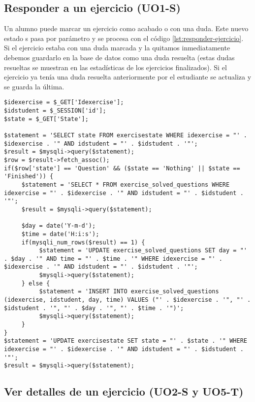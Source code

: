 \subsection{Responder a un ejercicio (UO1-S)}
\label{diseno-e-implementacion:logica-negocio:responder-ejercicio}

Un alumno puede marcar un ejercicio como acabado o con una duda. Este nuevo estado s pasa por parámetro y se procesa con el código \ref{lst:responder-ejercicio}.\\

Si el ejercicio estaba con una duda marcada y la quitamos inmediatamente debemos guardarlo en la base de datos como una duda resuelta (estas dudas resueltas se muestran en las estadísticas de los ejercicios finalizados). Si el ejercicio ya tenía una duda resuelta anteriormente por el estudiante se actualiza y se guarda la última.\\

\noindent
\begin{lstlisting}[caption=Responder a un ejercicio.,label={lst:responder-ejercicio}]
$idexercise = $_GET['Idexercise'];
$idstudent = $_SESSION['id'];
$state = $_GET['State'];

$statement = 'SELECT state FROM exercisestate WHERE idexercise = "' . $idexercise . '" AND idstudent = "' . $idstudent . '"';
$result = $mysqli->query($statement);
$row = $result->fetch_assoc();
if($row['state'] == 'Question' && ($state == 'Nothing' || $state == 'Finished')) {
     $statement = 'SELECT * FROM exercise_solved_questions WHERE idexercise = "' . $idexercise . '" AND idstudent = "' . $idstudent . '"';
     $result = $mysqli->query($statement);
	
     $day = date('Y-m-d');
     $time = date('H:i:s');
     if(mysqli_num_rows($result) == 1) {
          $statement = 'UPDATE exercise_solved_questions SET day = "' . $day . '" AND time = "' . $time . '" WHERE idexercise = "' . $idexercise . '" AND idstudent = "' . $idstudent . '"';
          $mysqli->query($statement);
     } else {
          $statement = 'INSERT INTO exercise_solved_questions (idexercise, idstudent, day, time) VALUES ("' . $idexercise . '", "' . $idstudent . '", "' . $day . '", "' . $time . '")';
          $mysqli->query($statement);
     }
}
$statement = 'UPDATE exercisestate SET state = "' . $state . '" WHERE idexercise = "' . $idexercise . '" AND idstudent = "' . $idstudent . '"';
$result = $mysqli->query($statement);
\end{lstlisting}

\subsection{Ver detalles de un ejercicio (UO2-S y UO5-T)}
\label{diseno-e-implementacion:logica-negocio:ver-detalles-ejercicio}

